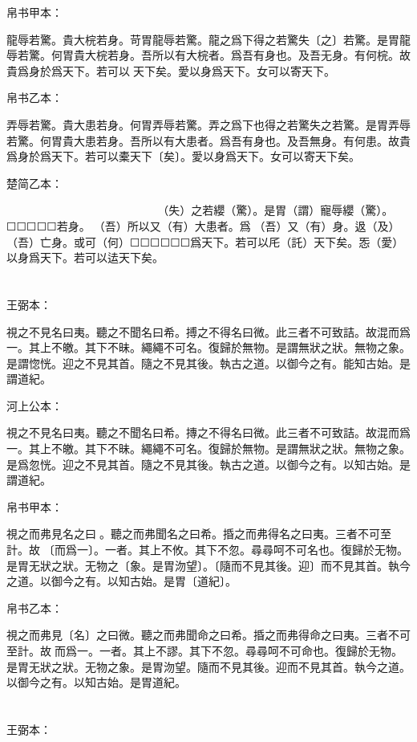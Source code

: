 \documentclass[a5paper]{ctexbook}
\begin{document}
    帛书甲本：

    龍辱若驚。貴大梡若身。苛胃龍辱若驚。龍之爲下得之若驚失〔之〕若驚。是胃龍辱若驚。何胃貴大梡若身。吾所以有大梡者。爲吾有身也。及吾无身。有何梡。故貴爲身於爲天下。若可以𨒙天下矣。愛以身爲天下。女可以寄天下。

    帛书乙本：

    弄辱若驚。貴大患若身。何胃弄辱若驚。弄之爲下也得之若驚失之若驚。是胃弄辱若驚。何胃貴大患若身。吾所以有大患者。爲吾有身也。及吾無身。有何患。故貴爲身於爲天下。若可以橐天下〔矣〕。愛以身爲天下。女可以寄天下矣。

    楚简乙本：

    𢤲（寵）辱若纓（驚）。貴大患若身。可（何）胃（謂）𢤲（寵）辱。𢤲（寵）爲下也。得之若纓（驚）。󶴡（失）之若纓（驚）。是胃（謂）寵辱纓（驚）。☐☐☐☐☐若身。󼾲（吾）所以又（有）大患者。爲󼾲（吾）又（有）身。﨤（及）󼾲（吾）亡身。或可（何）☐☐☐☐☐☐爲天下。若可以厇（託）天下矣。㤅（愛）以身爲天下。若可以迲天下矣。

    \chapter{}
    王弼本：

    視之不見名曰夷。聽之不聞名曰希。搏之不得名曰微。此三者不可致詰。故混而爲一。其上不皦。其下不昧。繩繩不可名。復歸於無物。是謂無狀之狀。無物之象。是謂惚恍。迎之不見其首。隨之不見其後。執古之道。以御今之有。能知古始。是謂道紀。

    河上公本：

    視之不見名曰夷。聽之不聞名曰希。摶之不得名曰微。此三者不可致詰。故混而爲一。其上不皦。其下不昧。繩繩不可名。復歸於無物。是謂無狀之狀。無物之象。是爲忽恍。迎之不見其首。隨之不見其後。執古之道。以御今之有。以知古始。是謂道紀。

    帛书甲本：

    視之而弗見名之曰󱁚。聽之而弗聞名之曰希。捪之而弗得名之曰夷。三者不可至計。故𡇯〔而爲一〕。一者。其上不攸。其下不忽。尋尋呵不可名也。復歸於无物。是胃无狀之狀。无物之〔象。是胃沕望〕。〔隨而不見其後。迎〕而不見其首。執今之道。以御今之有。以知古始。是胃〔道紀〕。

    帛书乙本：

    視之而弗見〔名〕之曰微。聽之而弗聞命之曰希。捪之而弗得命之曰夷。三者不可至計。故𦀲而爲一。一者。其上不謬。其下不忽。尋尋呵不可命也。復歸於无物。是胃无狀之狀。无物之象。是胃沕望。隨而不見其後。迎而不見其首。執今之道。以御今之有。以知古始。是胃道紀。

    \chapter{}
    王弼本：
\end{document}
